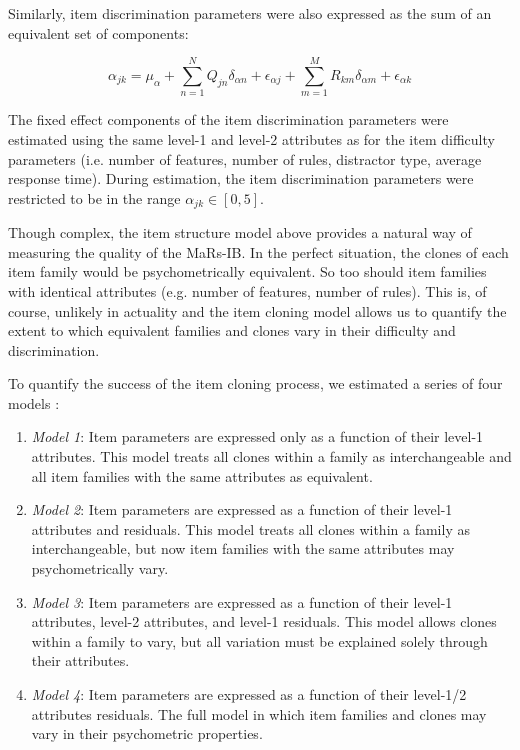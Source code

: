 \documentclass[a4paper,man,natbib]{apa6}
\begin{document}
Similarly, item discrimination parameters were also expressed as the sum of an equivalent set of components:

\begin{equation}
\alpha_{jk} = \mu_\alpha + \sum_{n=1}^N Q_{jn} \delta_{\alpha n} + \epsilon_{\alpha j} + \sum_{m=1}^M R_{km} \delta_{\alpha m} + \epsilon_{\alpha k}
\end{equation}

\noindent The fixed effect components of the item discrimination parameters were estimated using the same level-1 and level-2 attributes as for the item difficulty parameters (i.e. number of features, number of rules, distractor type, average response time). During estimation, the item discrimination parameters were restricted to be in the range $\alpha_{jk} \in [0, 5]$.

Though complex, the item structure model above provides a natural way of measuring the quality of the MaRs-IB. In the perfect situation, the clones of each item family would be psychometrically equivalent. So too should item families with identical attributes (e.g. number of features, number of rules). This is, of course, unlikely in actuality and the item cloning model allows us to quantify the extent to which equivalent families and clones vary in their difficulty and discrimination. 

To quantify the success of the item cloning process, we estimated a series of four models \citep{cho2014additive, lathrop2017item}: 

\begin{enumerate}

\item \textit{Model 1}: Item parameters are expressed only as a function of their level-1 attributes. This model treats all clones within a family as interchangeable and all item families with the same attributes as equivalent. 

\item \textit{Model 2}: Item parameters are expressed as a function of their level-1 attributes and residuals. This model treats all clones within a family as interchangeable, but now item families with the same attributes may psychometrically vary. 

\item \textit{Model 3}: Item parameters are expressed as a function of their level-1 attributes, level-2 attributes, and level-1 residuals. This model allows clones within a family to vary, but all variation must be explained solely through their attributes.  

\item \textit{Model 4}: Item parameters are expressed as a function of their level-1/2 attributes residuals. The full model in which item families and clones may vary in their psychometric properties. 

\end{enumerate}
\end{document}
